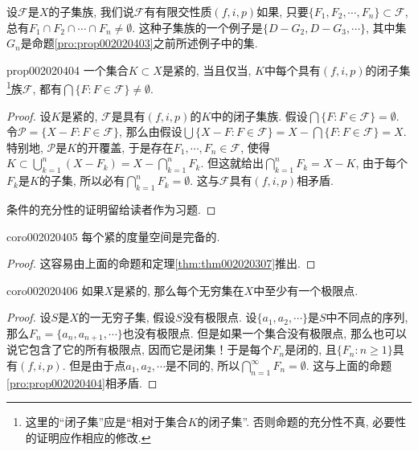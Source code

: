 设$\mathscr{F}$是$X$的子集族, 我们说$\mathscr{F}$有有限交性质$(f, i, p)$如果, 只要$\{F_1, F_2, \cdots, F_n\} \subset \mathscr{F}$, 总有$F_1 \cap F_2 \cap \cdots \cap F_n \neq \emptyset$. 这种子集族的一个例子是$\{D - G_2, D-G_3, \cdots\}$, 其中集$G_n$是命题\ref{pro:prop002020403}之前所述例子中的集. 

\begin{proposition}{}{prop002020404}
一个集合$K \subset X$是紧的, 当且仅当, $K$中每个具有$(f,i,p)$的闭子集\footnote{这里的“闭子集”应是“相对于集合$K$的闭子集”. 否则命题的充分性不真, 必要性的证明应作相应的修改. }族$\mathscr{F}$, 都有$\bigcap\{F: F \in \mathscr{F}\} \neq \emptyset$. 
\end{proposition}

\begin{proof}
设$K$是紧的, $\mathscr{F}$是具有$(f,i,p)$的$K$中的闭子集族. 假设$\bigcap\{F: F \in \mathscr{F}\} = \emptyset$. 令$\mathscr{P} = \{X - F: F \in \mathscr{F}\}$, 那么由假设$\bigcup\{X - F: F \in \mathscr{F}\} = X - \bigcap\{F: F \in \mathscr{F}\} = X$. 特别地, $\mathscr{P}$是$K$的开覆盖, 于是存在$F_1, \cdots, F_n \in \mathscr{F}$, 使得$K \subset \bigcup_{k=1}^{n}{(X - F_k)} = X - \bigcap_{k=1}^{n}{F_k}$. 但这就给出$\bigcap_{k=1}^{n}{F_k} = X - K$, 由于每个$F_k$是$K$的子集, 所以必有$\bigcap_{k=1}^{n}{F_k} = \emptyset$. 这与$\mathscr{F}$具有$(f,i,p)$相矛盾. 

条件的充分性的证明留给读者作为习题. 
\end{proof}

\begin{corollary}{}{coro002020405}
每个紧的度量空间是完备的. 
\end{corollary}

\begin{proof}
这容易由上面的命题和定理\ref{thm:thm002020307}推出. 
\end{proof}

\begin{corollary}{}{coro002020406}
如果$X$是紧的, 那么每个无穷集在$X$中至少有一个极限点. 
\end{corollary}

\begin{proof}
设$S$是$X$的一无穷子集, 假设$S$没有极限点. 设$\{a_1, a_2, \cdots\}$是$S$中不同点的序列, 那么$F_n = \{a_n, a_{n+1}, \cdots\}$也没有极限点. 但是如果一个集合没有极限点, 那么也可以说它包含了它的所有极限点, 因而它是闭集！于是每个$F_n$是闭的, 且$\{F_n : n \ge 1\}$具有$(f,i,p)$. 但是由于点$a_1, a_2,\cdots$是不同的, 所以$\bigcap_{n=1}^{\infty}{F_n} = \emptyset$. 这与上面的命题\ref{pro:prop002020404}相矛盾. 
\end{proof}

